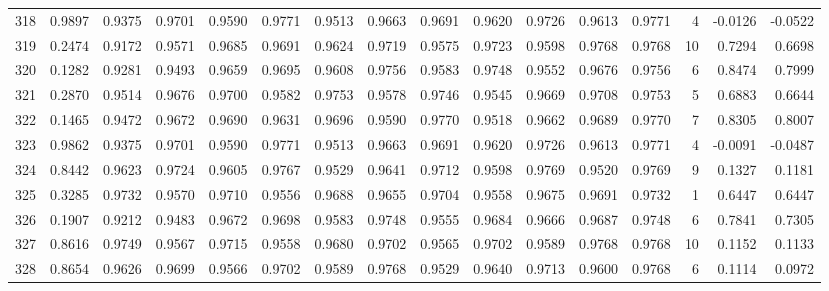 \begin{tabular}{lrrrrrrrrrrrrrrr}
318 &      0.9897 &  0.9375 &  0.9701 &  0.9590 &  0.9771 &  0.9513 &  0.9663 &  0.9691 &  0.9620 &  0.9726 &   0.9613 &     0.9771 &      4 &                   -0.0126 &                    -0.0522 \\
319 &      0.2474 &  0.9172 &  0.9571 &  0.9685 &  0.9691 &  0.9624 &  0.9719 &  0.9575 &  0.9723 &  0.9598 &   0.9768 &     0.9768 &     10 &                    0.7294 &                     0.6698 \\
320 &      0.1282 &  0.9281 &  0.9493 &  0.9659 &  0.9695 &  0.9608 &  0.9756 &  0.9583 &  0.9748 &  0.9552 &   0.9676 &     0.9756 &      6 &                    0.8474 &                     0.7999 \\
321 &      0.2870 &  0.9514 &  0.9676 &  0.9700 &  0.9582 &  0.9753 &  0.9578 &  0.9746 &  0.9545 &  0.9669 &   0.9708 &     0.9753 &      5 &                    0.6883 &                     0.6644 \\
322 &      0.1465 &  0.9472 &  0.9672 &  0.9690 &  0.9631 &  0.9696 &  0.9590 &  0.9770 &  0.9518 &  0.9662 &   0.9689 &     0.9770 &      7 &                    0.8305 &                     0.8007 \\
323 &      0.9862 &  0.9375 &  0.9701 &  0.9590 &  0.9771 &  0.9513 &  0.9663 &  0.9691 &  0.9620 &  0.9726 &   0.9613 &     0.9771 &      4 &                   -0.0091 &                    -0.0487 \\
324 &      0.8442 &  0.9623 &  0.9724 &  0.9605 &  0.9767 &  0.9529 &  0.9641 &  0.9712 &  0.9598 &  0.9769 &   0.9520 &     0.9769 &      9 &                    0.1327 &                     0.1181 \\
325 &      0.3285 &  0.9732 &  0.9570 &  0.9710 &  0.9556 &  0.9688 &  0.9655 &  0.9704 &  0.9558 &  0.9675 &   0.9691 &     0.9732 &      1 &                    0.6447 &                     0.6447 \\
326 &      0.1907 &  0.9212 &  0.9483 &  0.9672 &  0.9698 &  0.9583 &  0.9748 &  0.9555 &  0.9684 &  0.9666 &   0.9687 &     0.9748 &      6 &                    0.7841 &                     0.7305 \\
327 &      0.8616 &  0.9749 &  0.9567 &  0.9715 &  0.9558 &  0.9680 &  0.9702 &  0.9565 &  0.9702 &  0.9589 &   0.9768 &     0.9768 &     10 &                    0.1152 &                     0.1133 \\
328 &      0.8654 &  0.9626 &  0.9699 &  0.9566 &  0.9702 &  0.9589 &  0.9768 &  0.9529 &  0.9640 &  0.9713 &   0.9600 &     0.9768 &      6 &                    0.1114 &                     0.0972 \\

\end{tabular}
